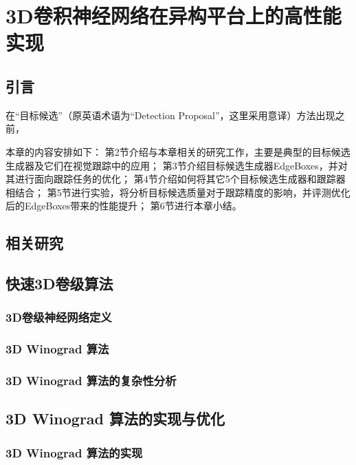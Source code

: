 \chapter{3D卷积神经网络在异构平台上的高性能实现}
\label{chapijcv}

\section{引言}
在``目标候选''（原英语术语为``Detection Proposal''，这里采用意译）方法出现之前，

本章的内容安排如下：
第2节介绍与本章相关的研究工作，主要是典型的目标候选生成器及它们在视觉跟踪中的应用；
第3节介绍目标候选生成器EdgeBoxes，并对其进行面向跟踪任务的优化；
第4节介绍如何将其它5个目标候选生成器和跟踪器相结合；
第5节进行实验，将分析目标候选质量对于跟踪精度的影响，并评测优化后的EdgeBoxes带来的性能提升；
第6节进行本章小结。



\section{相关研究}


\section{快速3D卷级算法}


\subsection{3D卷级神经网络定义}

\subsection{3D Winograd 算法}

\subsection{3D Winograd 算法的复杂性分析}


\section{3D Winograd 算法的实现与优化}

\subsection{3D Winograd 算法的实现}

